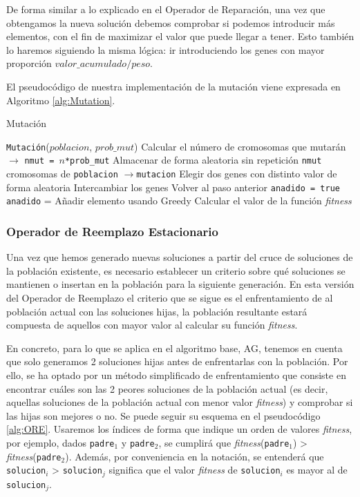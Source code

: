 De forma similar a lo explicado en el Operador de Reparación, una vez que obtengamos la nueva solución debemos comprobar si podemos introducir más elementos, con el fin de maximizar el valor que puede llegar a tener. 
Esto también lo haremos siguiendo la misma lógica: ir introduciendo los genes con mayor proporción $valor\_acumulado/peso$. 

El pseudocódigo de nuestra implementación de la mutación viene expresada en Algoritmo \ref{alg:Mutation}. 

\begin{algorithm}
\caption{Mutación}\label{alg:Mutation}
\begin{algorithmic}[1]
\Procedure \texttt{Mutación}($poblacion$, $prob\_mut$)
\State Calcular el número de cromosomas que mutarán $\xrightarrow{}{}$ \texttt{nmut = $n$*prob\_mut}
\State Almacenar de forma aleatoria sin repetición \texttt{nmut} cromosomas de \texttt{poblacion} $\xrightarrow{}{}$\texttt{mutacion}
	\State Elegir dos genes con distinto valor de forma aleatoria
		\State Intercambiar los genes
	\Else
		\State Volver al paso anterior
	\EndIf
	\State \texttt{anadido = true} 
		\State \texttt{anadido} = Añadir elemento usando Greedy
	\EndWhile
	\State Calcular el valor de la función \textit{fitness}
\EndFor
\EndProcedure
\end{algorithmic}
\end{algorithm}

\subsubsection{Operador de Reemplazo Estacionario}

Una vez que hemos generado nuevas soluciones a partir del cruce de soluciones de la población existente, es necesario establecer un criterio sobre qué soluciones se mantienen o insertan en la población para la siguiente generación. 
En esta versión del Operador de Reemplazo el criterio que se sigue es el enfrentamiento de al población actual con las soluciones hijas, la población resultante estará compuesta de aquellos con mayor valor al calcular su función \textit{fitness}. 

En concreto, para lo que se aplica en el algoritmo base, AG, tenemos en cuenta que solo generamos 2 soluciones hijas antes de enfrentarlas con la población. 
Por ello, se ha optado por un método simplificado de enfrentamiento que consiste en encontrar cuáles son las 2 peores soluciones de la población actual (es decir, aquellas soluciones de la población actual con menor valor \textit{fitness}) y comprobar si las hijas son mejores o no. 
Se puede seguir su esquema en el pseudocódigo \ref{alg:ORE}. 
Usaremos los índices de forma que indique un orden de valores \textit{fitness}, por ejemplo, dados \texttt{padre$_1$} y  \texttt{padre$_2$}, se cumplirá que \textit{fitness}(\texttt{padre$_1$}) > \textit{fitness}(\texttt{padre$_2$}). 
Además, por conveniencia en la notación, se entenderá que \texttt{solucion$_i$} > \texttt{solucion$_j$} significa que el valor \textit{fitness} de \texttt{solucion$_i$} es mayor al de \texttt{solucion$_j$}.

